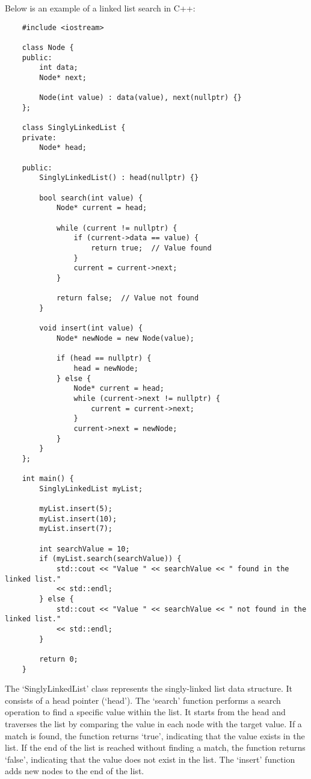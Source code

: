 \begin{solution}
    Below is an example of a linked list search in C++:
    
    \horizontalline

    \begin{verbatim}
    #include <iostream>

    class Node {
    public:
        int data;
        Node* next;
    
        Node(int value) : data(value), next(nullptr) {}
    };
    
    class SinglyLinkedList {
    private:
        Node* head;
    
    public:
        SinglyLinkedList() : head(nullptr) {}
    
        bool search(int value) {
            Node* current = head;
    
            while (current != nullptr) {
                if (current->data == value) {
                    return true;  // Value found
                }
                current = current->next;
            }
    
            return false;  // Value not found
        }
    
        void insert(int value) {
            Node* newNode = new Node(value);
    
            if (head == nullptr) {
                head = newNode;
            } else {
                Node* current = head;
                while (current->next != nullptr) {
                    current = current->next;
                }
                current->next = newNode;
            }
        }
    };
    
    int main() {
        SinglyLinkedList myList;
    
        myList.insert(5);
        myList.insert(10);
        myList.insert(7);
    
        int searchValue = 10;
        if (myList.search(searchValue)) {
            std::cout << "Value " << searchValue << " found in the linked list." 
            << std::endl;
        } else {
            std::cout << "Value " << searchValue << " not found in the linked list." 
            << std::endl;
        }
    
        return 0;
    }
    \end{verbatim}

    \horizontalline

    The `SinglyLinkedList' class represents the singly-linked list data structure. It consists of a head pointer (`head'). The `search' function performs a search operation to find a specific value within the list. It starts from the head and traverses the list by comparing the value in each 
    node with the target value. If a match is found, the function returns `true', indicating that the value exists in the list. If the end of the list is reached without finding a match, the function returns `false', indicating that the value does not exist in the list. The `insert' function 
    adds new nodes to the end of the list.


\end{solution}
